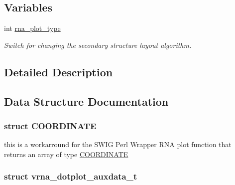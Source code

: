 \subsection*{Variables}
\begin{DoxyCompactItemize}
\item 
int \hyperlink{group__plotting__utils_ga5964c4581431b098b80027d6e14dcdd4}{rna\+\_\+plot\+\_\+type}
\begin{DoxyCompactList}\small\item\em Switch for changing the secondary structure layout algorithm. \end{DoxyCompactList}\end{DoxyCompactItemize}


\subsection{Detailed Description}


\subsection{Data Structure Documentation}
\label{structCOORDINATE}
\subsubsection{struct C\+O\+O\+R\+D\+I\+N\+A\+TE}
this is a workarround for the S\+W\+IG Perl Wrapper R\+NA plot function that returns an array of type \hyperlink{group__plotting__utils_structCOORDINATE}{C\+O\+O\+R\+D\+I\+N\+A\+TE} \label{structvrna__dotplot__auxdata__t}
\subsubsection{struct vrna\+\_\+dotplot\+\_\+auxdata\+\_\+t}


